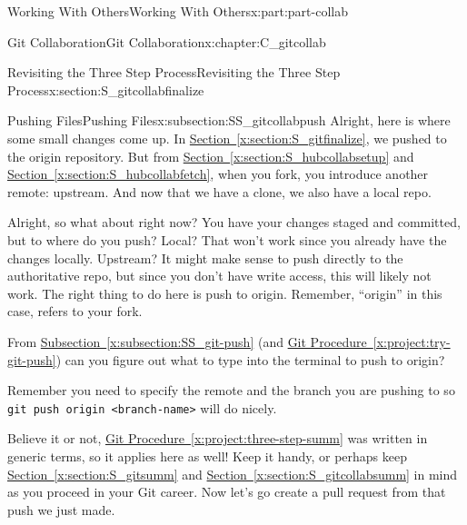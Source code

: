 \documentclass[oneside,10pt,]{book}
\newcommand{\xreffont}{\relax}
\newcommand{\mono}[1]{\texttt{#1}}
\begin{document}
\begin{partptx}{Working With Others}{}{Working With Others}{}{}{x:part:part-collab}
\begin{chapterptx}{Git Collaboration}{}{Git Collaboration}{}{}{x:chapter:C_gitcollab}
\begin{sectionptx}{Revisiting the Three Step Process}{}{Revisiting the Three Step Process}{}{}{x:section:S_gitcollabfinalize}
%
%
\typeout{************************************************}
\typeout{************************************************}
%
\begin{subsectionptx}{Pushing Files}{}{Pushing Files}{}{}{x:subsection:SS_gitcollabpush}
%
%
Alright, here is where some small changes come up. In \hyperref[x:section:S_gitfinalize]{Section~{\xreffont\ref{x:section:S_gitfinalize}}}, we pushed to the origin repository. But from \hyperref[x:section:S_hubcollabsetup]{Section~{\xreffont\ref{x:section:S_hubcollabsetup}}} and \hyperref[x:section:S_hubcollabfetch]{Section~{\xreffont\ref{x:section:S_hubcollabfetch}}}, when you fork, you introduce another remote: upstream. And now that we have a clone, we also have a local repo.%
\par
Alright, so what about right now? You have your changes staged and committed, but to where do you push? Local? That won't work since you already have the changes locally. Upstream? It might make sense to push directly to the authoritative repo, but since you don't have write access, this will likely not work. The right thing to do here is push to origin. Remember, ``origin'' in this case, refers to your fork.%
\par
From \hyperref[x:subsection:SS_git-push]{Subsection~{\xreffont\ref{x:subsection:SS_git-push}}} (and \hyperref[x:project:try-git-push]{Git Procedure~{\xreffont\ref{x:project:try-git-push}}}) can you figure out what to type into the terminal to push to origin?%
\par
Remember you need to specify the remote and the branch you are pushing to so \mono{git push origin <branch-name>} will do nicely.%
\end{subsectionptx}
\begin{conclusion}{}%
Believe it or not, \hyperref[x:project:three-step-summ]{Git Procedure~{\xreffont\ref{x:project:three-step-summ}}} was written in generic terms, so it applies here as well! Keep it handy, or perhaps keep \hyperref[x:section:S_gitsumm]{Section~{\xreffont\ref{x:section:S_gitsumm}}} and \hyperref[x:section:S_gitcollabsumm]{Section~{\xreffont\ref{x:section:S_gitcollabsumm}}} in mind as you proceed in your Git career. Now let's go create a pull request from that push we just made.%
\end{conclusion}%
\end{sectionptx}
%
%
\typeout{************************************************}
\typeout{************************************************}

\end{chapterptx}
\end{partptx}
\end{document}
